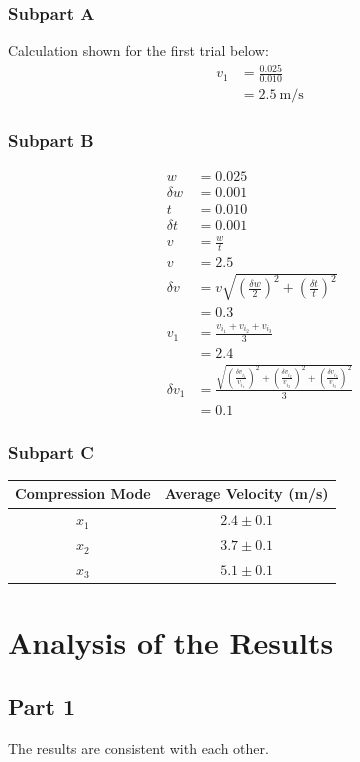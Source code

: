 \documentclass[8pt]{extarticle}
\newcommand{\plain}[1]{\textrm{#1}}
\begin{document}
{\subsubsection*{Subpart A}
Calculation shown for the first trial below:
\begin{align*}
	v_{1} &= \frac{0.025}{0.010}\\
	&= 2.5~\plain{m/s} 
\end{align*}
\subsubsection*{Subpart B}
\begin{align*}
	w &= 0.025\\
	\delta w &= 0.001\\
	t &= 0.010 \\
	\delta t &= 0.001 \\
	v &= \frac{w}{t}\\
	v &= 2.5 \\
	\delta v &= v\sqrt{\left(\frac{\delta w}{2}\right)^2 + \left(\frac{\delta t}{t}\right)^2} \\
	&= 0.3\\
	v_{1} &= \frac{v_{i_1} + v_{i_2} + v_{i_3}}{3}\\
	&= 2.4\\
	\delta v_1 &= \frac{\sqrt{\left(\frac{\delta v_{i_1}}{v_{i_1}}\right)^2 + \left(\frac{\delta v_{i_2}}{v_{i_2}}\right)^2 + \left(\frac{\delta v_{i_3}}{v_{i_3}}\right)^2}}{3} \\
	&= 0.1 
\end{align*}
\subsubsection*{Subpart C}
\begin{center}
	\renewcommand{\arraystretch}{1.5}
	\begin{tabular}{c|c}
		Compression Mode & Average Velocity (m/s) \\
		\hline
		$x_1$ & $2.4\pm 0.1$ \\
		$x_2$ & $3.7\pm 0.1$\\
		$x_3$ & $5.1\pm 0.1$
	\end{tabular}
\end{center}
\section*{Analysis of the Results}
\subsection*{Part 1}
The results are consistent with each other.
}
\end{document}
